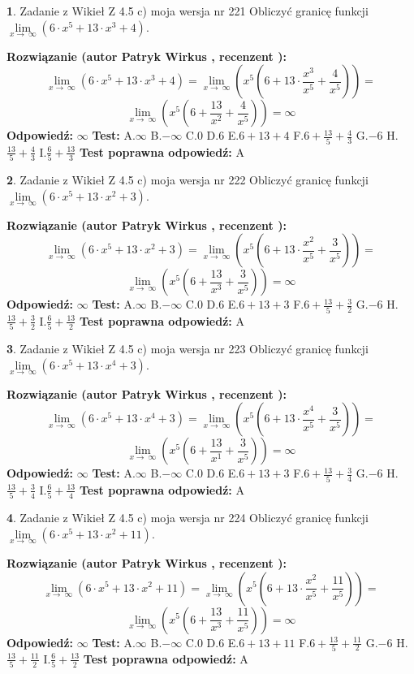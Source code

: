 \documentclass[12pt, a4paper]{article}
\theoremstyle{definition} %
\newtheorem{zad}{}
\newcommand{\zadStart}[1]{\begin{zad}#1\newline}
\newcommand{\zadStop}{\end{zad}}
\newcommand{\rozwStart}[2]{\noindent \textbf{Rozwiązanie (autor #1 , recenzent #2): }\newline}
\newcommand{\rozwStop}{\newline}
\newcommand{\odpStart}{\noindent \textbf{Odpowiedź:}\newline}
\newcommand{\odpStop}{\newline}
\newcommand{\testStart}{\noindent \textbf{Test:}\newline}
\newcommand{\testStop}{\newline}
\newcommand{\kluczStart}{\noindent \textbf{Test poprawna odpowiedź:}\newline}
\newcommand{\kluczStop}{\newline}
\begin{document}
\zadStart{Zadanie z Wikieł Z 4.5 c) moja wersja nr 221}
Obliczyć granicę funkcji  $\lim\limits_{x\to\ \infty}(6 \cdot x^{5}+13 \cdot x^{3}+4)$.
\zadStop
\rozwStart{Patryk Wirkus}{}
$$\lim\limits_{x\to\ \infty}(6 \cdot x^{5}+13 \cdot x^{3}+4) = \lim\limits_{x\to\ \infty}(x^{5}(6 +13 \cdot \frac{x^{3}}{x^{5}}+\frac{4}{x^{5}})) =$$ $$\lim\limits_{x\to\ \infty}(x^{5}(6 +\frac{13}{x^{2}}+\frac{4}{x^{5}})) =\infty$$
\rozwStop
\odpStart
$\infty$
\odpStop
\testStart
A.$\infty$ B.$-\infty$ C.$0$ D.$6$ E.$6 + 13 + 4$
F.$6+\frac{13}{5}+\frac{4}{3}$ G.$-6$
H.$\frac{13}{5}+\frac{4}{3}$
I.$\frac{6}{5}+\frac{13}{3}$
\testStop
\kluczStart
A
\kluczStop



\zadStart{Zadanie z Wikieł Z 4.5 c) moja wersja nr 222}
Obliczyć granicę funkcji  $\lim\limits_{x\to\ \infty}(6 \cdot x^{5}+13 \cdot x^{2}+3)$.
\zadStop
\rozwStart{Patryk Wirkus}{}
$$\lim\limits_{x\to\ \infty}(6 \cdot x^{5}+13 \cdot x^{2}+3) = \lim\limits_{x\to\ \infty}(x^{5}(6 +13 \cdot \frac{x^{2}}{x^{5}}+\frac{3}{x^{5}})) =$$ $$\lim\limits_{x\to\ \infty}(x^{5}(6 +\frac{13}{x^{3}}+\frac{3}{x^{5}})) =\infty$$
\rozwStop
\odpStart
$\infty$
\odpStop
\testStart
A.$\infty$ B.$-\infty$ C.$0$ D.$6$ E.$6 + 13 + 3$
F.$6+\frac{13}{5}+\frac{3}{2}$ G.$-6$
H.$\frac{13}{5}+\frac{3}{2}$
I.$\frac{6}{5}+\frac{13}{2}$
\testStop
\kluczStart
A
\kluczStop



\zadStart{Zadanie z Wikieł Z 4.5 c) moja wersja nr 223}
Obliczyć granicę funkcji  $\lim\limits_{x\to\ \infty}(6 \cdot x^{5}+13 \cdot x^{4}+3)$.
\zadStop
\rozwStart{Patryk Wirkus}{}
$$\lim\limits_{x\to\ \infty}(6 \cdot x^{5}+13 \cdot x^{4}+3) = \lim\limits_{x\to\ \infty}(x^{5}(6 +13 \cdot \frac{x^{4}}{x^{5}}+\frac{3}{x^{5}})) =$$ $$\lim\limits_{x\to\ \infty}(x^{5}(6 +\frac{13}{x^{1}}+\frac{3}{x^{5}})) =\infty$$
\rozwStop
\odpStart
$\infty$
\odpStop
\testStart
A.$\infty$ B.$-\infty$ C.$0$ D.$6$ E.$6 + 13 + 3$
F.$6+\frac{13}{5}+\frac{3}{4}$ G.$-6$
H.$\frac{13}{5}+\frac{3}{4}$
I.$\frac{6}{5}+\frac{13}{4}$
\testStop
\kluczStart
A
\kluczStop



\zadStart{Zadanie z Wikieł Z 4.5 c) moja wersja nr 224}
Obliczyć granicę funkcji  $\lim\limits_{x\to\ \infty}(6 \cdot x^{5}+13 \cdot x^{2}+11)$.
\zadStop
\rozwStart{Patryk Wirkus}{}
$$\lim\limits_{x\to\ \infty}(6 \cdot x^{5}+13 \cdot x^{2}+11) = \lim\limits_{x\to\ \infty}(x^{5}(6 +13 \cdot \frac{x^{2}}{x^{5}}+\frac{11}{x^{5}})) =$$ $$\lim\limits_{x\to\ \infty}(x^{5}(6 +\frac{13}{x^{3}}+\frac{11}{x^{5}})) =\infty$$
\rozwStop
\odpStart
$\infty$
\odpStop
\testStart
A.$\infty$ B.$-\infty$ C.$0$ D.$6$ E.$6 + 13 + 11$
F.$6+\frac{13}{5}+\frac{11}{2}$ G.$-6$
H.$\frac{13}{5}+\frac{11}{2}$
I.$\frac{6}{5}+\frac{13}{2}$
\testStop
\kluczStart
A
\kluczStop
\end{document}
